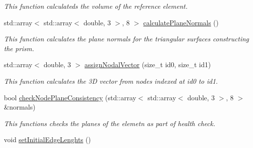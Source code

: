 \begin{DoxyCompactItemize}
\begin{DoxyCompactList}\small\item\em This function calculateds the volume of the reference element. \end{DoxyCompactList}\item 
\hypertarget{classPrism_a76072439f768fd9a6bc6e5c23e3fa617}{}std\+::array$<$ std\+::array$<$ double, 3 $>$, 8 $>$ \hyperlink{classPrism_a76072439f768fd9a6bc6e5c23e3fa617}{calculate\+Plane\+Normals} ()\label{classPrism_a76072439f768fd9a6bc6e5c23e3fa617}

\begin{DoxyCompactList}\small\item\em This function calculates the plane normals for the triangular surfaces constructing the prism. \end{DoxyCompactList}\item 
\hypertarget{classPrism_af07401eaf9dde65f81895606575ecf48}{}std\+::array$<$ double, 3 $>$ \hyperlink{classPrism_af07401eaf9dde65f81895606575ecf48}{assign\+Nodal\+Vector} (size\+\_\+t id0, size\+\_\+t id1)\label{classPrism_af07401eaf9dde65f81895606575ecf48}

\begin{DoxyCompactList}\small\item\em This function calculates the 3\+D vector from nodes indexed at id0 to id1. \end{DoxyCompactList}\item 
\hypertarget{classPrism_a4d1f1f37d08fd9aefebc42cb6f63efab}{}bool \hyperlink{classPrism_a4d1f1f37d08fd9aefebc42cb6f63efab}{check\+Node\+Plane\+Consistency} (std\+::array$<$ std\+::array$<$ double, 3 $>$, 8 $>$ \&normals)\label{classPrism_a4d1f1f37d08fd9aefebc42cb6f63efab}

\begin{DoxyCompactList}\small\item\em This functions checks the planes of the elemetn as part of health check. \end{DoxyCompactList}\item 
\hypertarget{classPrism_a19996bf8336c7c6d3fc11bdc45bf8992}{}void \hyperlink{classPrism_a19996bf8336c7c6d3fc11bdc45bf8992}{set\+Initial\+Edge\+Lenghts} ()\label{classPrism_a19996bf8336c7c6d3fc11bdc45bf8992}


\end{DoxyCompactItemize}
